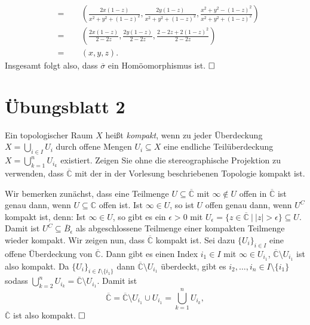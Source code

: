 \documentclass[11pt]{book}
\numberwithin{dummy}{section}
\theoremstyle{nonumberbreak}
\newenvironment{prob}[1][]{\ifthenelse{\equal{#1}{}}{\problem}{\problem[#1]}\rm}{\endproblem}
\newenvironment{sol}[1][]{\ifthenelse{\equal{#1}{}}{\solution}{\solution[#1]}\rm}{\endsolution}
\newcommand{\C}{\mathbb{C}}
\newcommand{\CC}{\overline{\mathbb{C}}}
\begin{document}
\begin{spacing}{1.4}
\begin{prob}
\begin{sol}
\begin{alignat*}{5}
&=&& \ \ \left( \frac{2x (1-z)}{x^2+y^2 + (1-z)^2}, \frac{2y(1-z)}{x^2+y^2+(1-z)^2}, \frac{x^2+y^2-(1-z)^2}{x^2+y^2+(1-z)^2} \right) \\[6pt]
&=&& \ \ \left( \frac{2x(1-z)}{2-2z}, \frac{2y(1-z)}{2-2z}, \frac{2-2z + 2 (1-z)^2}{2-2z} \right) \\[6pt]
&=&& \ \ (x,y,z).
\end{alignat*}
Insgesamt folgt also, dass $\overline{\sigma}$ ein Homöomorphismus ist. $\hfill \Box$
\end{sol}

\end{prob}








\newpage




\titlespacing*{\section}{-16.5pt}{0pt}{20pt}
\renewcommand*\thesection{}
\section{Übungsblatt 2} %
\renewcommand*\thesection{\arabic{section}}


\begin{prob}     %
Ein topologischer Raum $X$ heißt \textit{kompakt}, wenn zu jeder Überdeckung $X=\bigcup_{i \in I} U_i$ durch offene Mengen $U_i \subseteq X$ eine endliche Teilüberdeckung $X=\bigcup_{k=1}^n U_{i_k}$ existiert. Zeigen Sie ohne die stereographische Projektion zu verwenden, dass $\CC$ mit der in der Vorlesung beschriebenen Topologie kompakt ist.

\begin{sol}
Wir bemerken zunächst, dass eine Teilmenge $U \subseteq \CC$ mit $\infty \notin U$ offen in $\CC$ ist genau dann, wenn $U \subseteq \C$ offen ist. Ist $\infty \in U$, so ist $U$ offen genau dann, wenn $U^C$ kompakt ist, denn: Ist $\infty \in U$, so gibt es ein $\epsilon >0$ mit $U_{\epsilon} = \{z \in \CC \ \vert \ \vert z \vert > \epsilon\} \subseteq U$. Damit ist $U^C \subseteq \overline{B}_{\epsilon}$ als abgeschlossene Teilmenge einer kompakten Teilmenge wieder kompakt. Wir zeigen nun, dass $\CC$ kompakt ist. Sei dazu $\{U_i\}_{i \in I}$ eine offene Überdeckung von $\CC$. Dann gibt es einen Index $i_1\in I$ mit $\infty \in U_{i_1}$, $\CC \setminus U_{i_1}$ ist also kompakt. Da $\{U_i\}_{i \in I\setminus \{i_1\}}$ dann $\CC \setminus U_{i_1}$ überdeckt, gibt es $i_2, \ldots, i_n \in I\setminus \{i_1\}$ sodass $\bigcup_{k=2}^n U_{i_k} = \CC \setminus U_{i_1}$. Damit ist $$\CC= \CC \setminus U_{i_1} \cup U_{i_1} = \bigcup_{k=1}^n U_{i_k},$$
$\CC$ ist also kompakt. $\hfill \Box$


\end{sol}
\end{prob}
\end{spacing}
\end{document}
